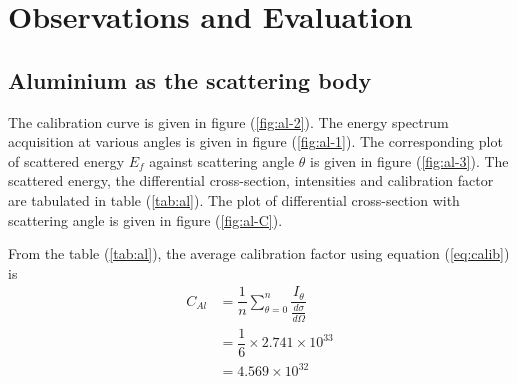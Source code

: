 \documentclass[%
 reprint,
nofootinbib,
 amsmath,amssymb,
 aps,
floatfix,
]{revtex4-2}
\begin{document}
\section{Observations and Evaluation}
    \subsection{Aluminium as the scattering body}
    The calibration curve is given in figure (\ref{fig:al-2}). The energy spectrum acquisition at various angles is given in figure (\ref{fig:al-1}). The corresponding plot of scattered energy $E_f$ against scattering angle $\theta$ is given in figure (\ref{fig:al-3}). The scattered energy, the differential cross-section, intensities and calibration factor are tabulated in table (\ref{tab:al}). The plot of differential cross-section with scattering angle is given in figure (\ref{fig:al-C}).
    \par
    From the table (\ref{tab:al}), the average calibration factor using equation (\ref{eq:calib}) is
    \begin{equation}
        \begin{split}
            C_{Al} &= \dfrac{1}{n} \sum_{\theta = 0}^{n} \dfrac{I_{\theta}}{\frac{d \sigma}{d \Omega}} \\
            &= \dfrac{1}{6} \times 2.741 \times 10^{33} \\
            &= \boxed{4.569 \times 10^{32}}
        \end{split}
    \end{equation}
\end{document}
